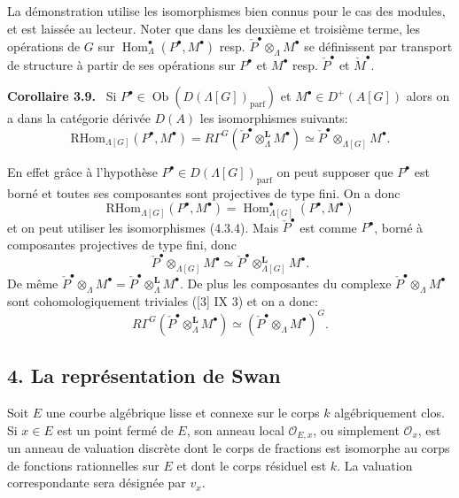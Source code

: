 \documentclass[11pt]{article}
\newenvironment{statement}[1]{\par\medskip\noindent\textbf{#1.}\ }{\par\medskip}
\DeclareMathOperator{\Hom}{Hom}
\providecommand{\RHom}{\mathrm{RHom}}
\providecommand{\parf}{\mathrm{parf}}
\providecommand{\RHom}{\mathrm{RHom}}
\providecommand{\Hom}{\operatorname{Hom}}
\providecommand{\RHom}{\mathrm R\mathcal{H}om}
\providecommand{\parf}{\mathrm{parf}}
\providecommand{\RHom}{\mathrm{RHom}}
\providecommand{\Hom}{\operatorname{Hom}}
\begin{document}
La démonstration utilise les isomorphismes bien connus pour le cas des modules, et est laissée au lecteur. Noter que dans les deuxième et troisième terme, les opérations de $G$ sur $\Hom_\Lambda^\bullet(P^\bullet,M^\bullet)$ resp. $\check P^\bullet\otimes_\Lambda M^\bullet$ se définissent par transport de structure à partir de ses opérations sur $P^\bullet$ et $M^\bullet$ resp. $\check P^\bullet$ et $\check M^\bullet$.

\begin{statement}{Corollaire 3.9}
Si $P^\bullet\in \operatorname{Ob}(D(\Lambda[G])_{\parf})$ et $M^\bullet\in D^+(A[G])$ alors on a dans la catégorie dérivée $D(A)$ les isomorphismes suivants:
\[
\RHom_{\Lambda[G]}(P^\bullet,M^\bullet)
=R\Gamma^G(\check P^\bullet\otimes_\Lambda^{\mathbf L}M^\bullet)
\simeq \check P^\bullet\otimes_{\Lambda[G]}M^\bullet.
\tag{3.9.1}
\]
\end{statement}

En effet grâce à l'hypothèse $P^\bullet\in D(\Lambda[G])_{\parf}$ on peut supposer que $P^\bullet$ est borné et toutes ses composantes sont projectives de type fini. On a donc
\[
\RHom_{\Lambda[G]}(P^\bullet,M^\bullet)=\Hom_{\Lambda[G]}^\bullet(P^\bullet,M^\bullet)
\]
et on peut utiliser les isomorphismes (4.3.4). Mais $\check P^\bullet$ est comme $P^\bullet$, borné à composantes projectives de type fini, donc
\[
\check P^\bullet\otimes_{\Lambda[G]}M^\bullet\simeq \check P^\bullet\otimes_{\Lambda[G]}^{\mathbf L}M^\bullet.
\]
De même $\check P^\bullet\otimes_\Lambda M^\bullet=\check P^\bullet\otimes_\Lambda^{\mathbf L}M^\bullet$. De plus les composantes du complexe $\check P^\bullet\otimes_\Lambda M^\bullet$ sont cohomologiquement triviales ([3] IX 3) et on a donc:
\[
R\Gamma^G(\check P^\bullet\otimes_\Lambda^{\mathbf L}M^\bullet)\simeq (\check P^\bullet\otimes_\Lambda M^\bullet)^G.
\]

\subsection*{4. La représentation de Swan}

Soit $E$ une courbe algébrique lisse et connexe sur le corps $k$ algébriquement clos. Si $x\in E$ est un point fermé de $E$, son anneau local $\mathcal O_{E,x}$, ou simplement $\mathcal O_x$, est un anneau de valuation discrète dont le corps de fractions est isomorphe au corps de fonctions rationnelles sur $E$ et dont le corps résiduel est $k$. La valuation correspondante sera désignée par $v_x$.
\end{document}

